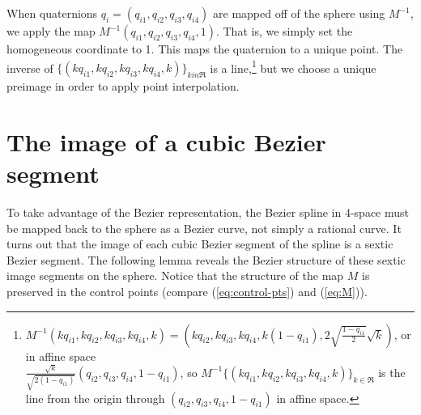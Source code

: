 When quaternions $q_i = (q_{i1},q_{i2},q_{i3},q_{i4})$ are mapped off
of the sphere using $M^{-1}$,
we apply the map $M^{-1}(q_{i1},q_{i2},q_{i3},q_{i4},1)$.
That is, we simply set the homogeneous coordinate to 1.
This maps the quaternion to a unique point.
The inverse of $\{(kq_{i1},kq_{i2},kq_{i3},kq_{i4},k)\}_{k in \Re}$
is a line,\footnote{$M^{-1}(kq_{i1},kq_{i2},kq_{i3},kq_{i4},k) = 
	(kq_{i2},kq_{i3},kq_{i4},k(1-q_{i1}),2\sqrt{\frac{1-q_{i1}}{2}} \sqrt{k})$, 
	or in affine space \\
	$\frac{\sqrt{k}}{\sqrt{2(1-q_{i1})}} (q_{i2},q_{i3},q_{i4},1-q_{i1})$,
	so $M^{-1}\{(kq_{i1},kq_{i2},kq_{i3},kq_{i4},k)\}_{k \in \Re}$
	is the line from the origin through $(q_{i2},q_{i3},q_{i4},1-q_{i1})$ 
	in affine space.}
but we choose a unique preimage in order to apply point interpolation.

\section{The image of a cubic Bezier segment}
\label{sec:sextic}

To take advantage of the Bezier representation,
the Bezier spline in 4-space must be mapped back to the sphere
as a Bezier curve, not simply a rational curve.
It turns out that the image of each cubic Bezier segment of the spline
is a sextic Bezier segment.
The following lemma reveals the Bezier structure of these sextic
image segments on the sphere.
Notice that the structure of the map $M$ is preserved in the control
points (compare (\ref{eq:control-pts}) and (\ref{eq:M})).

